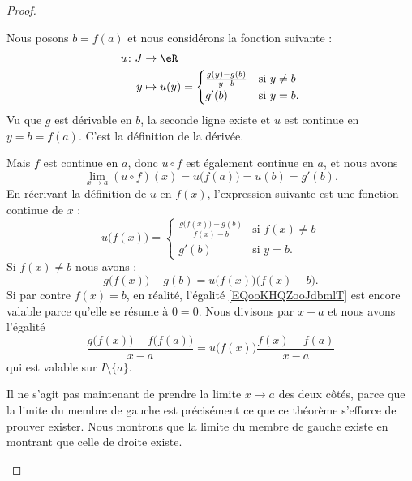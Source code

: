 \begin{proof}
\begin{subproof}
		Nous posons \( b=f(a)\) et nous considérons la fonction suivante :
		\begin{equation}
			\begin{aligned}
				u\colon J & \to \eR                                 \\
				y         & \mapsto u(y)=\begin{cases}
					\frac{ g(y)-g(b) }{ y-b } & \text{si } y\neq b \\
					g'(b)                     & \text{si } y=b.
				\end{cases}
			\end{aligned}
		\end{equation}
		Vu que \( g\) est dérivable en \( b\), la seconde ligne existe et \( u\) est continue en \( y=b=f(a)\). C'est la définition de la dérivée.

		Mais \( f\) est continue en \( a\), donc \( u\circ f\) est également continue en \( a\), et nous avons
		\begin{equation}
			\lim_{x\to a} (u\circ f)(x)=u\big( f(a) \big)=u(b)=g'(b).
		\end{equation}
		En récrivant la définition de \( u\) en \( f(x)\), l'expression suivante est une fonction continue de \( x\) :
		\begin{equation}
			u\big( f(x) \big)=\begin{cases}
				\frac{ g\big( f(x) \big)-g(b) }{ f(x)-b } & \text{si } f(x)\neq b \\
				g'(b)                                     & \text{si } y=b.
			\end{cases}
		\end{equation}
		Si \( f(x)\neq b\) nous avons :
		\begin{equation}        \label{EQooKHQZooJdbmlT}
			g\big( f(x) \big)-g(b)=u\big( f(x) \big)\big( f(x)-b \big).
		\end{equation}
		Si par contre \( f(x)=b\), en réalité, l'égalité \eqref{EQooKHQZooJdbmlT} est encore valable parce qu'elle se résume à \( 0=0\). Nous divisons par \( x-a\) et nous avons l'égalité
		\begin{equation}
			\frac{ g\big( f(x) \big)-f\big( f(a) \big) }{ x-a }=u\big( f(x) \big)\frac{ f(x)-f(a) }{ x-a }
		\end{equation}
		qui est valable sur \( I\setminus\{ a \}\).

		Il ne s'agit pas maintenant de prendre la limite \( x\to a\) des deux côtés, parce que la limite du membre de gauche est précisément ce que ce théorème s'efforce de prouver exister. Nous montrons que la limite du membre de gauche existe en montrant que celle de droite existe.


\end{subproof}
\end{proof}
